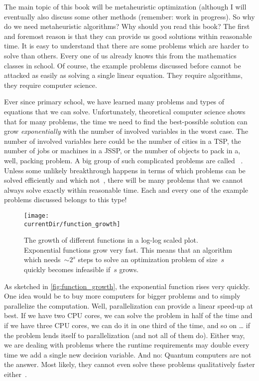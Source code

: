 %
%
The main topic of this book will be metaheuristic optimization (although I will eventually also discuss some other methods (remember: work in progress).
So why do we need metaheuristic algorithms?
Why should you read this book?%
%
%
\label{sec:approximationOfTheOptimum}%
%
The first and foremost reason is that they can provide us good solutions within reasonable time.
It is easy to understand that there are some problems which are harder to solve than others.
Every one of us already knows this from the mathematics classes in school.
Of course, the example problems discussed before cannot be attacked as easily as solving a single linear equation.
They require algorithms, they require computer science.

Ever since primary school, we have learned many problems and types of equations that we can solve.
Unfortunately, theoretical computer science shows that for many problems, the time we need to find the best-possible solution can grow \emph{exponentially} with the number of involved variables in the worst case.
The number of involved variables here could be the number of cities in a TSP, the number of jobs or machines in a JSSP, or the number of objects to pack in a, well, packing problem.
A big group of such complicated problems are called \NPhard~\cite{LLRKS1993SASAAC,CPW1998AROMSCAAA}.
Unless some unlikely breakthrough happens in terms of which problems can be solved efficiently and which not~\cite{C1971TCOTPP,K1972RACP}, there will be many problems that we cannot always solve exactly within reasonable time.
Each and every one of the example problems discussed belongs to this type!

\begin{figure}%
\centering%
\texttt{[image: \\currentDir/function\_growth]}%
\caption{The growth of different functions in a log-log scaled plot. Exponential functions grow very fast. This means that an algorithm which needs~$\sim 2^s$ steps to solve an optimization problem of size~$s$ quickly becomes infeasible if~$s$ grows.}%
\label{fig:function_growth}%
\end{figure}

As sketched in \autoref{fig:function_growth}, the exponential function rises very quickly.
One idea would be to buy more computers for bigger problems and to simply parallelize the computation.
Well, parallelization can provide a linear speed-up at best.
If we have two CPU cores, we can solve the problem in half of the time and if we have three CPU cores, we can do it in one third of the time, and so on {\dots} if the problem lends itself to parallelization (and not all of them do).
Either way, we are dealing with problems where the runtime requirements may double every time we add a single new decision variable.
And no: Quantum computers are not the answer.
Most likely, they cannot even solve these problems qualitatively faster either~\cite{A2008TLOQC}.

